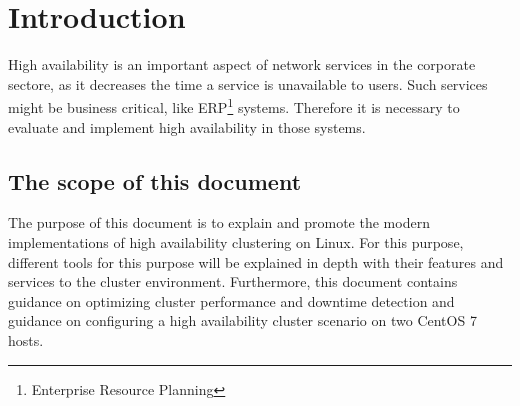 \section{Introduction}

High availability is an important aspect of network services in the corporate
sectore, as it decreases the time a service is unavailable to users.
Such services might be business critical, like ERP\footnote{Enterprise Resource Planning} systems.
Therefore it is necessary to evaluate and implement high availability in those systems.

\subsection{The scope of this document}
The purpose of this document is to explain and promote the modern implementations of high availability clustering
on Linux. For this purpose, different tools for this purpose will be explained in depth with their features and services to the cluster environment. Furthermore, this document contains guidance on optimizing cluster performance and downtime detection and guidance on configuring a high availability cluster scenario on two CentOS 7 hosts.